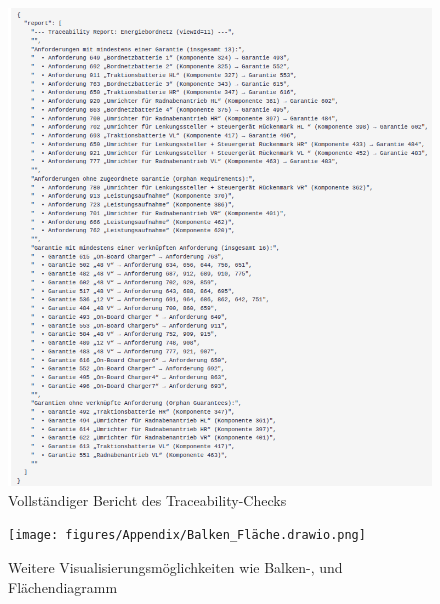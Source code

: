 \begin{figure}[h!]
  \centering
  \includegraphics[width=\textwidth]{figures/06Evaluation/Bildschirmfoto vom 2025-06-29 13-23-12.png}
  \caption{Vollständiger Bericht des Traceability-Checks}
  \label{fig:fullresult}
\end{figure}

\begin{figure}[h!]
  \centering
\texttt{[image: figures/Appendix/Balken\_Fläche.drawio.png]}
\caption{Weitere Visualisierungsmöglichkeiten wie Balken-, und Flächendiagramm}
\label{fig:metricvis}
\end{figure}